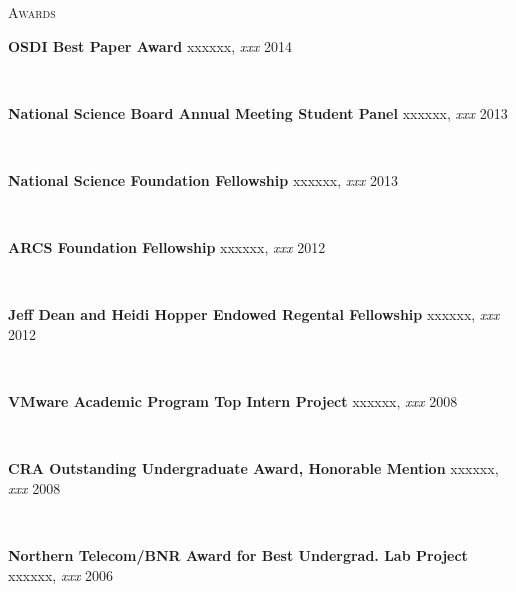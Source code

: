 \documentclass[10pt,times]{report}
\newlength{\sectiongap}
\newlength{\entrygap}
\newlength{\sectioncolwidth}
\newlength{\colgap}
\newlength{\stuffwidth}
\def\ifEqString#1#2{\def\testa{#1}\def\testb{#2}%
  \ifx\testa\testb}
\newenvironment{rtable}{
  \begin{minipage}{\textwidth}
  }{
  \end{minipage}
}
\newenvironment{rentry}[3][xxx]{
  \begin{minipage}[t]{\hsize}
    \textbf{#2}\ifEqString{#1}{xxx}\relax\else, \textit{#1}\fi
    \hspace{\stretch{1}} #3 \\
  }{
    \removelastskip
  \end{minipage}
  \\[\entrygap]  %
}
\newenvironment{rsection}[1]{
  \begin{minipage}[t]{\sectioncolwidth}
    \textsc{#1}
  \end{minipage}
  \hspace{\colgap}
  \begin{minipage}[t]{\stuffwidth}
  }{
    \removelastskip
  \end{minipage}
  \\[\sectiongap]
}
\begin{document}
\begin{rtable}
\begin{rsection}{Awards}
\begin{rentry}{OSDI Best Paper Award}{2014}
    \end{rentry}
    \begin{rentry}{National Science Board Annual Meeting Student
        Panel}{2013}
      \vspace{-0.5em}
    \end{rentry}
    \begin{rentry}{National Science Foundation Fellowship}{2013}
      \vspace{-0.5em}
    \end{rentry}
    \begin{rentry}{ARCS Foundation Fellowship}{2012}
       \vspace{-0.5em}
    \end{rentry}
    \begin{rentry}{Jeff Dean and Heidi Hopper Endowed Regental Fellowship}{2012}
       \vspace{-0.5em}
    \end{rentry}
    \begin{rentry}{VMware Academic Program Top Intern Project}{2008}
       \vspace{-0.5em}
    \end{rentry}
    \begin{rentry}{CRA Outstanding Undergraduate Award, Honorable
      Mention}{2008}
    \vspace{-0.5em}
    \end{rentry}
    \begin{rentry}{Northern Telecom/BNR Award for Best Undergrad. Lab
        Project}{2006}
      \vspace{-0.5em}
    \end{rentry}
  \end{rsection}


\end{rtable}
\end{document}
